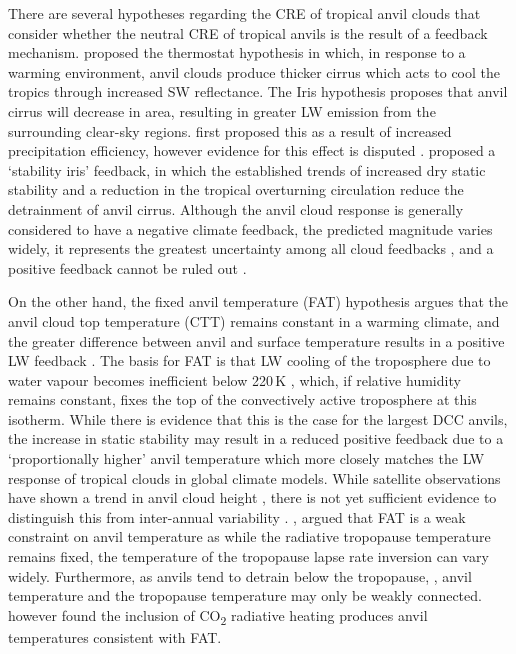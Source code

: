 \documentclass[acp, manuscript]{copernicus}
\begin{document}
There are several hypotheses regarding the CRE of tropical anvil clouds that consider whether the neutral CRE of tropical anvils is the result of a feedback mechanism. 
\citet{ramanathan_cloudradiative_1989} proposed the thermostat hypothesis in which, in response to a warming environment, anvil clouds produce thicker cirrus which acts to cool the tropics through increased SW reflectance. 
The Iris hypothesis proposes that anvil cirrus will decrease in area, resulting in greater LW emission from the surrounding clear-sky regions.
\citet{lindzen_does_2001} first proposed this as a result of increased precipitation efficiency, however evidence for this effect is disputed \citep{delgenio_climatic_2002, lin_examination_2004}.
\citet{bony_thermodynamic_2016} proposed a `stability iris' feedback, in which the established trends of increased dry static stability \citep{held_robust_2006} and a reduction in the tropical overturning circulation \citep{vecchi_global_2007} reduce the detrainment of anvil cirrus.
Although the anvil cloud response is generally considered to have a negative climate feedback, the predicted magnitude varies widely, it represents the greatest uncertainty among all cloud feedbacks \citep{sherwood_assessment_2020}, and a positive feedback cannot be ruled out \citep{gasparini_opinion_2023b}.

On the other hand, the fixed anvil temperature (FAT) hypothesis argues that the anvil cloud top temperature (CTT) remains constant in a warming climate, and the greater difference between anvil and surface temperature results in a positive LW feedback \citep{hartmann_important_2002}.
The basis for FAT is that LW cooling of the troposphere due to water vapour becomes inefficient below 220\,\unit{K} \citep{jeevanjee_simple_2020}, which, if relative humidity remains constant, fixes the top of the convectively active troposphere at this isotherm. 
While there is evidence that this is the case for the largest DCC anvils, the increase in static stability may result in a reduced positive feedback due to a `proportionally higher' anvil temperature \citep{zelinka_why_2010} which more closely matches the LW response of tropical clouds in global climate models.
While satellite observations have shown a trend in anvil cloud height \citep{norris_evidence_2016}, there is not yet sufficient evidence to distinguish this from inter-annual variability \citep{takahashi_when_2019}.
\citet{seeley_fat_2019}, argued that FAT is a weak constraint on anvil temperature as while the radiative tropopause temperature remains fixed, the temperature of the tropopause lapse rate inversion can vary widely. 
Furthermore, as anvils tend to detrain below the tropopause, \citep{takahashi_level_2017, wang_observational_2020}, anvil temperature and the tropopause temperature may only be weakly connected.
\citet{seidel_temperatures_2022} however found the inclusion of CO\textsubscript{2} radiative heating produces anvil temperatures consistent with FAT.
\end{document}
